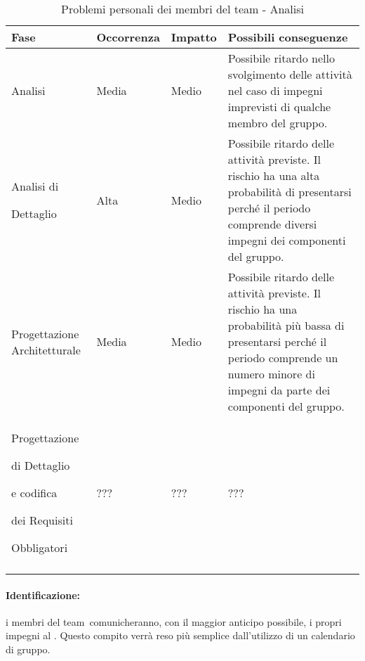 \documentclass[../PianoProgetto.tex]{subfiles}
\begin{document}
	\hspace{0pt}
		\begin{longtabu} to \textwidth {X[.55] X[c .50] X[c .50] X}
			\toprule
			\textbf{Fase} & \textbf{Occorrenza} & \textbf{Impatto} & \textbf{Possibili conseguenze}\\
			\midrule
			Analisi & Media & Medio & Possibile ritardo nello svolgimento delle attività nel caso di impegni imprevisti di qualche membro del gruppo. \\
			\midrule
			Analisi di \par Dettaglio & Alta & Medio & Possibile ritardo delle attività previste. Il rischio ha una alta probabilità di presentarsi perché il periodo comprende diversi impegni dei componenti del gruppo.\\
			\midrule
			Progettazione Architetturale & Media & Medio & Possibile ritardo delle attività previste. Il rischio ha una probabilità più bassa di presentarsi perché il periodo comprende un numero minore di impegni da parte dei componenti del gruppo.\\
			\midrule
			Progettazione \par di Dettaglio \par e codifica \par dei Requisiti \par Obbligatori & ??? & ??? & ???\\
			\bottomrule

		\caption{Problemi personali dei membri del team - Analisi}
		\label{tab:Problemi personali dei membri del team - Analisi}	
	\end{longtabu}
		
	\paragraph*{Identificazione:} i membri del team\g\ comunicheranno, con il maggior anticipo possibile, i propri impegni al \responsabilediprogetto . Questo compito verrà reso più semplice dall'utilizzo di un calendario di gruppo. 
	
\end{document}
